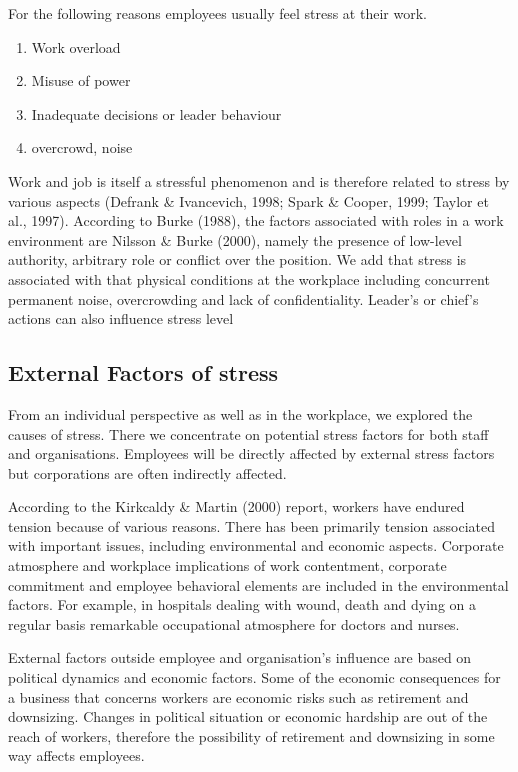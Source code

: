 For the following reasons employees usually feel stress at their work.
\begin{enumerate}
    \item Work overload
    \item Misuse of power
    \item Inadequate decisions or leader behaviour
    \item overcrowd, noise
\end{enumerate}


Work and job is itself a stressful phenomenon and is therefore related to stress by various aspects (Defrank \& Ivancevich, 1998; Spark \& Cooper, 1999; Taylor et al., 1997). According to Burke (1988), the factors associated with roles in a work environment are Nilsson \& Burke (2000), namely the presence of low-level authority, arbitrary role or conflict over the position. We add that stress is associated with that physical conditions at the workplace including concurrent permanent noise, overcrowding and lack of confidentiality. Leader's or chief's actions can also influence stress level \cite[p.9]{Fairbrother2003WorkplaceSatisfaction}

\subsection{External Factors of stress}

From an individual perspective as well as in the workplace, we explored the causes of stress. There we concentrate on potential stress factors for both staff and organisations. Employees will be directly affected by external stress factors but corporations are often indirectly affected.

According to the Kirkcaldy \& Martin (2000) report, workers have endured tension because of various reasons. There has been primarily tension associated with important issues, including environmental and economic aspects.   Corporate atmosphere and workplace implications of work contentment, corporate commitment and employee behavioral elements are included in the environmental factors.   For example, in hospitals dealing with wound, death and dying on a regular basis remarkable occupational atmosphere for doctors and nurses. \citet[p.10]{Fairbrother2003WorkplaceSatisfaction}

External factors outside employee and organisation's influence are based on political dynamics and economic factors.  Some of the economic consequences for a business that concerns workers are economic risks such as retirement and downsizing. Changes in political situation or economic hardship are out of the reach of workers, therefore the possibility of retirement and downsizing in some way affects employees. \cite[p.320]{Bloisi2007ManagementBehaviour}

